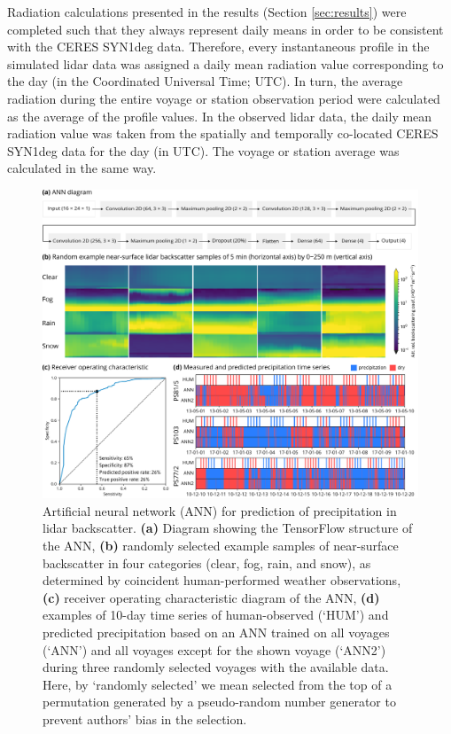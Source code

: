 \documentclass[12pt,a4paper]{article}
\begin{document}
Radiation calculations presented in the results (Section \ref{sec:results})
were completed such that they always represent daily means in order to be consistent with the CERES SYN1deg data. Therefore, every instantaneous profile in the
simulated lidar data was assigned a daily mean radiation value corresponding to
the day (in the Coordinated Universal Time; UTC). In turn, the average
radiation during the entire voyage or station observation period were
calculated as the average of the profile values. In the observed lidar data,
the daily mean radiation value was taken from the spatially and temporally
co-located CERES SYN1deg data for the day (in UTC). The voyage or station
average was calculated in the same way.

\begin{figure}[b!]
\centering
\includegraphics[width=\textwidth]{img/ann.pdf}
\caption{
Artificial neural network (ANN) for prediction of precipitation in lidar
backscatter. \textbf{(a)} Diagram showing the TensorFlow structure of the ANN,
\textbf{(b)} randomly selected example samples of near-surface backscatter in
four categories (clear, fog, rain, and snow), as determined by coincident
human-performed weather observations, \textbf{(c)} receiver operating
characteristic diagram of the ANN, \textbf{(d)} examples of 10-day time series
of human-observed (`HUM') and predicted precipitation based on an ANN trained
on all voyages (`ANN') and all voyages except for the shown voyage (`ANN2')
during three randomly selected voyages with the available data. Here, by
`randomly selected' we mean selected from the top of a permutation generated by
a pseudo-random number generator to prevent authors' bias in the selection.
}
\label{fig:ann}
\end{figure}
\end{document}
